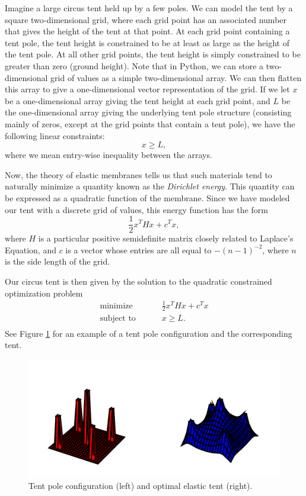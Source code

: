 Imagine a large circus tent held up by a few poles. We can model the tent by a square two-dimensional grid,
where each grid point has an associated number that gives the height of the tent at that point. At each
grid point containing a tent pole, the tent height is constrained to be at least as large as the height of
the tent pole. At all other grid points, the tent height is simply constrained to be greater than zero (ground height).
Note that in Python, we can store a two-dimensional grid of values as a simple two-dimensional array.
We can then flatten this array to give a one-dimensional vector representation of the grid.
If we let $x$ be a one-dimensional array giving the tent height at each grid point, and $L$ be the one-dimensional
array giving the underlying tent pole structure (consisting mainly of zeros, except at the grid points that contain
a tent pole), we have the following linear constraints:
\[
x \geq L,
\]
where we mean entry-wise inequality between the arrays.

Now, the theory of elastic membranes tells us that such materials tend to naturally minimize a quantity known
as the \emph{Dirichlet energy}. This quantity can be expressed as a quadratic function of the membrane.
Since we have modeled our tent with a discrete grid of values, this energy function has the form
\[
\frac{1}{2}x^T H x + c^T x,
\]
where $H$ is a particular positive semidefinite matrix closely related to Laplace's Equation, and $c$ is a
vector whose entries are all equal to $-(n-1)^{-2}$, where $n$ is the side length of the grid.

Our circus tent is then given by the solution to the quadratic constrained optimization problem
\begin{align*}
\text{minimize }\qquad &\frac{1}{2}x^T H x + c^T x\\
\text{subject to }\qquad &x \geq L.\\
\end{align*}
See Figure \ref{fig:tent} for an example of a tent pole configuration and the corresponding tent.

\begin{figure}
\includegraphics[width=\textwidth]{tent.pdf}
\caption{Tent pole configuration (left) and optimal elastic tent (right).}
\label{fig:tent}
\end{figure}

